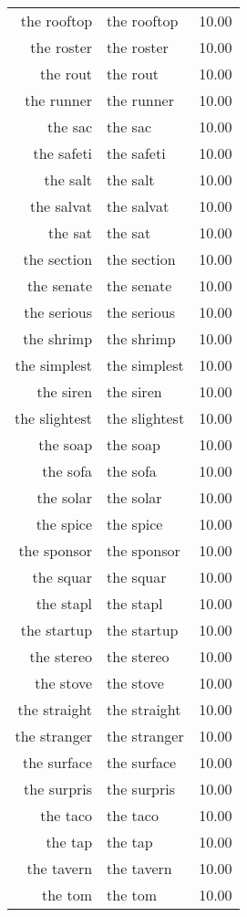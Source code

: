 \begin{table}[ht]
\begin{tabular}{rlr}
  the rooftop & the rooftop & 10.00 \\ 
  the roster & the roster & 10.00 \\ 
  the rout & the rout & 10.00 \\ 
  the runner & the runner & 10.00 \\ 
  the sac & the sac & 10.00 \\ 
  the safeti & the safeti & 10.00 \\ 
  the salt & the salt & 10.00 \\ 
  the salvat & the salvat & 10.00 \\ 
  the sat & the sat & 10.00 \\ 
  the section & the section & 10.00 \\ 
  the senate & the senate & 10.00 \\ 
  the serious & the serious & 10.00 \\ 
  the shrimp & the shrimp & 10.00 \\ 
  the simplest & the simplest & 10.00 \\ 
  the siren & the siren & 10.00 \\ 
  the slightest & the slightest & 10.00 \\ 
  the soap & the soap & 10.00 \\ 
  the sofa & the sofa & 10.00 \\ 
  the solar & the solar & 10.00 \\ 
  the spice & the spice & 10.00 \\ 
  the sponsor & the sponsor & 10.00 \\ 
  the squar & the squar & 10.00 \\ 
  the stapl & the stapl & 10.00 \\ 
  the startup & the startup & 10.00 \\ 
  the stereo & the stereo & 10.00 \\ 
  the stove & the stove & 10.00 \\ 
  the straight & the straight & 10.00 \\ 
  the stranger & the stranger & 10.00 \\ 
  the surface & the surface & 10.00 \\ 
  the surpris & the surpris & 10.00 \\ 
  the taco & the taco & 10.00 \\ 
  the tap & the tap & 10.00 \\ 
  the tavern & the tavern & 10.00 \\ 
  the tom & the tom & 10.00 \\ 

\end{tabular}
\end{table}
